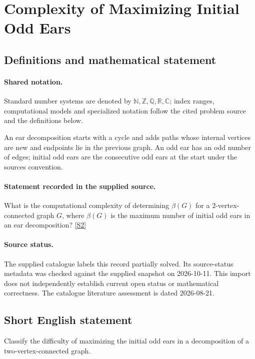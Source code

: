 \documentclass[11pt]{article}
\newcommand{\sref}[2]{\hyperlink{source:#1:#2}{[S#2]}}
\begin{document}
\section{Complexity of Maximizing Initial Odd Ears}\label{statement}

\subsection{Definitions and mathematical statement}

\paragraph{Shared notation.}Standard number systems are denoted by $\mathbb N,\mathbb Z,\mathbb Q,\mathbb R,\mathbb C$; index ranges, computational models and specialized notation follow the cited problem source and the definitions below.


An ear decomposition starts with a cycle and adds paths whose internal vertices are new and endpoints lie in the previous graph. An odd ear has an odd number of edges; initial odd ears are the consecutive odd ears at the start under the source\textquotesingle s convention.
\paragraph{Statement recorded in the supplied source.}
What is the computational complexity of determining $\beta(G)$ for a $2$-vertex-connected graph $G$, where $\beta(G)$ is the maximum number of initial odd ears in an ear decomposition? \sref{statement}{2}
\paragraph{Source status.}
The supplied catalogue labels this record partially solved. Its source-status metadata was checked against the supplied snapshot on 2026-10-11. This import does not independently establish current open status or mathematical correctness. The catalogue literature assessment is dated 2026-08-21.
\subsection{Short English statement}
Classify the difficulty of maximizing the initial odd ears in a decomposition of a two-vertex-connected graph.
\end{document}
